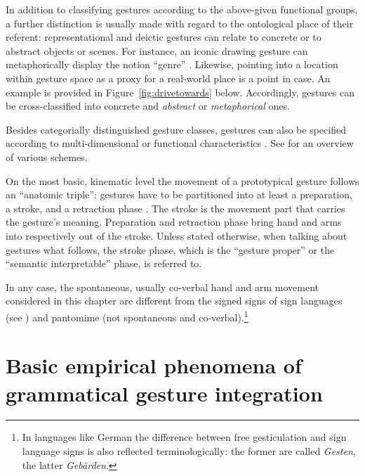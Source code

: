 \documentclass[output=paper]{langsci/langscibook}
\begin{document}
In addition to classifying gestures according to the above-given functional groups, a further distinction is usually made with regard to the ontological place of their referent: representational and deictic gestures can relate to concrete or to abstract objects or scenes. 
%
For instance, an iconic drawing gesture can metaphorically display the notion \enquote{genre} \citep[]{McNeill:1992}.
%
Likewise, pointing into a location within gesture space as a proxy for a real-world place is a point in case.
%
An example is provided in Figure~\ref{fig:drivetowards} below.
%
Accordingly, gestures can be cross-classified into concrete and \emph{abstract} or \emph{metaphorical}   ones.


Besides categorially distinguished gesture classes, gestures can also be specified according to multi-dimensional or functional characteristics \citep{McNeill:2005,Gerwing:Bavelas:2004}. See \citet{Ozyurek:2012} for an overview of various  schemes.


On the most basic, kinematic level the movement of a prototypical gesture follows an \enquote{anatomic triple}: gestures have to be partitioned into at least a preparation, a stroke, and a retraction     phase \citep{Kendon:1972}.
%
The stroke is the movement part that carries the gesture's meaning. 
%
Preparation and retraction phase bring hand and arms into respectively out of the stroke. 
%
Unless stated otherwise, when talking about gestures what follows, the stroke phase, which is the \enquote{gesture proper} or the \enquote{semantic interpretable} phase, is referred to.


In any case, the spontaneous, usually co-verbal hand and arm movement considered in this chapter are different from the signed signs of sign languages  (see ) and pantomime  (not spontaneous and co-verbal).\footnote{In languages like German the difference between free gesticulation and sign language signs is also reflected terminologically: the former are called \textit{Gesten}, the latter \textit{Gebärden}.}




\section{Basic empirical phenomena of grammatical gesture integration}
\label{sec:empir-desid-gramm}
\end{document}
